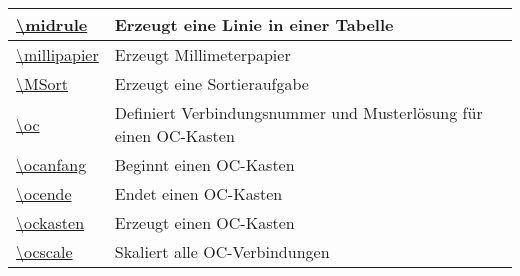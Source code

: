 \documentclass[./main.tex]{subfiles}
\begin{document}
\begin{tabularx}{\linewidth}{|l|X|}
    \hyperlink{midrule}{\textbackslash{}midrule}&Erzeugt eine Linie in einer Tabelle\\\hline
    \hyperlink{millipapier}{\textbackslash{}millipapier}&Erzeugt Millimeterpapier\\\hline
    \hyperlink{MSort}{\textbackslash{}MSort}&Erzeugt eine Sortieraufgabe\\\hline
    \hyperlink{oc}{\textbackslash{}oc}&Definiert Verbindungsnummer und Musterl\"osung f\"ur einen OC-Kasten\\\hline
    \hyperlink{ocanfang}{\textbackslash{}ocanfang}&Beginnt einen OC-Kasten\\\hline
    \hyperlink{ocende}{\textbackslash{}ocende}&Endet einen OC-Kasten\\\hline
    \hyperlink{ockasten}{\textbackslash{}ockasten}&Erzeugt einen OC-Kasten\\\hline
    \hyperlink{ocscale}{\textbackslash{}ocscale}&Skaliert alle OC-Verbindungen\\\hline
\end{tabularx}
\end{document}
